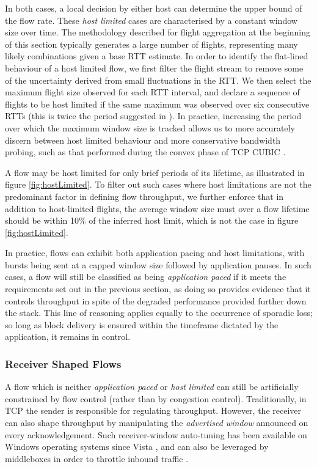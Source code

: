 In both cases, a local decision by either host can determine the upper bound of the flow rate.
These \emph{host limited} cases are characterised by a constant window size over time.
The methodology described for flight aggregation at the beginning of this section typically generates a large number of flights, representing many likely combinations given a base RTT estimate.
In order to identify the flat-lined behaviour of a host limited flow, we first filter the flight stream to remove some of the uncertainty derived from small fluctuations in the RTT.
We then select the maximum flight size observed for each RTT interval, and declare a sequence of flights to be host limited if the same maximum was observed over six consecutive RTTs (this is twice the period suggested in \cite{Zhang:2002p85}).
In practice, increasing the period over which the maximum window size is tracked allows us to more accurately discern between host limited behaviour and more conservative bandwidth probing, such as that performed during the convex phase of TCP CUBIC \cite{Ha:2008p471}.

A flow may be host limited for only brief periods of its lifetime, as illustrated in figure \ref{fig:hostLimited}.
To filter out such cases where host limitations are not the predominant factor in defining flow throughput, we further enforce that in addition to host-limited flights, the average window size must over a flow lifetime should be within 10\% of the inferred host limit, which is not the case in figure \ref{fig:hostLimited}.

In practice, flows can exhibit both application pacing and host limitations, with bursts being sent at a capped window size followed by application pauses.
In such cases, a flow will still be classified as being \emph{application paced} if it meets the requirements set out in the previous section, as doing so provides evidence that it controls throughput in spite of the degraded performance provided further down the stack. 
This line of reasoning applies equally to the occurrence of sporadic loss; so long as block delivery is ensured within the timeframe dictated by the application, it remains in control.

\subsubsection{Receiver Shaped Flows}
\label{sssec:rec}

A flow which is neither \emph{application paced} or \emph{host limited} can still be artificially constrained by flow control (rather than by congestion control).
Traditionally, in TCP the sender is responsible for regulating throughput. However, the receiver can also shape throughput by manipulating the \emph{advertised window} announced on every acknowledgement.
Such receiver-window auto-tuning has been available on Windows operating systems since Vista \cite{vistaReceiveWindow}, and can also be leveraged by middleboxes in order to throttle inbound traffic \cite{appEx}.

